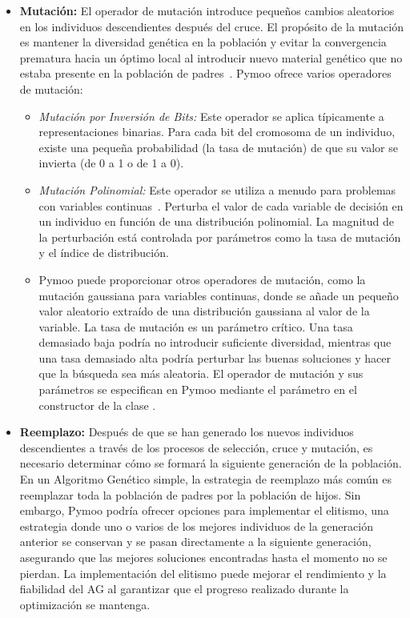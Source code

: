 \begin{itemize}[label=\textbullet, leftmargin=*]
    \item \textbf{Mutación:} El operador de mutación introduce pequeños cambios aleatorios en los individuos descendientes después del cruce. El propósito de la mutación es mantener la diversidad genética en la población y evitar la convergencia prematura hacia un óptimo local al introducir nuevo material genético que no estaba presente en la población de padres~\cite{goldberg1989, eiben2015}. Pymoo ofrece varios operadores de mutación:
    \begin{itemize}[label=\textbullet, leftmargin=*] %
        \item \textit{Mutación por Inversión de Bits:} Este operador se aplica típicamente a representaciones binarias. Para cada bit del cromosoma de un individuo, existe una pequeña probabilidad (la tasa de mutación) de que su valor se invierta (de 0 a 1 o de 1 a 0).
        \item \textit{Mutación Polinomial:} Este operador se utiliza a menudo para problemas con variables continuas~\cite{deb1996}. Perturba el valor de cada variable de decisión en un individuo en función de una distribución polinomial. La magnitud de la perturbación está controlada por parámetros como la tasa de mutación y el índice de distribución.
        \item Pymoo puede proporcionar otros operadores de mutación, como la mutación gaussiana para variables continuas, donde se añade un pequeño valor aleatorio extraído de una distribución gaussiana al valor de la variable. La tasa de mutación es un parámetro crítico. Una tasa demasiado baja podría no introducir suficiente diversidad, mientras que una tasa demasiado alta podría perturbar las buenas soluciones y hacer que la búsqueda sea más aleatoria. El operador de mutación y sus parámetros se especifican en Pymoo mediante el parámetro \texttt{} en el constructor de la clase \texttt{}.
    \end{itemize}

    \item \textbf{Reemplazo:} Después de que se han generado los nuevos individuos descendientes a través de los procesos de selección, cruce y mutación, es necesario determinar cómo se formará la siguiente generación de la población. En un Algoritmo Genético simple, la estrategia de reemplazo más común es reemplazar toda la población de padres por la población de hijos. Sin embargo, Pymoo podría ofrecer opciones para implementar el elitismo, una estrategia donde uno o varios de los mejores individuos de la generación anterior se conservan y se pasan directamente a la siguiente generación, asegurando que las mejores soluciones encontradas hasta el momento no se pierdan. La implementación del elitismo puede mejorar el rendimiento y la fiabilidad del AG al garantizar que el progreso realizado durante la optimización se mantenga.


\end{itemize}
